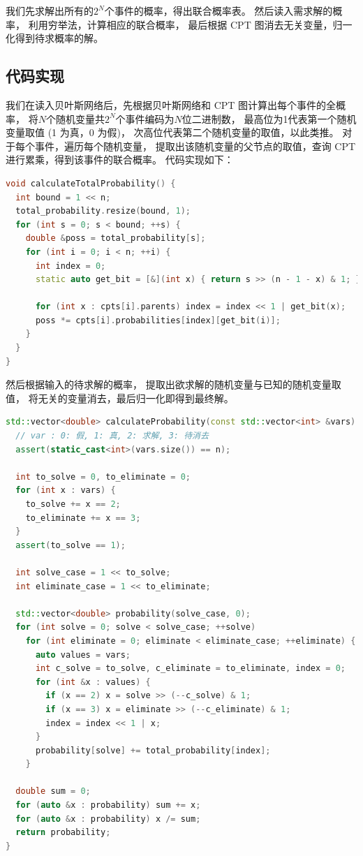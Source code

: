 \documentclass[12pt,onecolumn]{report}
\theoremstyle{plain}
\numberwithin{figure}{section}
\begin{document}
我们先求解出所有的$2^{N}$个事件的概率，得出联合概率表。
然后读入需求解的概率，
利用穷举法，计算相应的联合概率，
最后根据 CPT 图消去无关变量，归一化得到待求概率的解。

\subsection{代码实现}
我们在读入贝叶斯网络后，先根据贝叶斯网络和 CPT 图计算出每个事件的全概率，
将$N$个随机变量共$2^N$个事件编码为$N$位二进制数，
最高位为1代表第一个随机变量取值 (1 为真，0 为假)，
次高位代表第二个随机变量的取值，以此类推。
对于每个事件，遍历每个随机变量，
提取出该随机变量的父节点的取值，查询 CPT 进行累乘，得到该事件的联合概率。
代码实现如下：

\begin{lstlisting}[language=c++]
void calculateTotalProbability() {
  int bound = 1 << n;
  total_probability.resize(bound, 1);
  for (int s = 0; s < bound; ++s) {
    double &poss = total_probability[s];
    for (int i = 0; i < n; ++i) {
      int index = 0;
      static auto get_bit = [&](int x) { return s >> (n - 1 - x) & 1; };

      for (int x : cpts[i].parents) index = index << 1 | get_bit(x);
      poss *= cpts[i].probabilities[index][get_bit(i)];
    }
  }
}
\end{lstlisting}

然后根据输入的待求解的概率，
提取出欲求解的随机变量与已知的随机变量取值，
将无关的变量消去，最后归一化即得到最终解。

\begin{lstlisting}[language=c++]
std::vector<double> calculateProbability(const std::vector<int> &vars) const {
  // var : 0: 假, 1: 真, 2: 求解, 3: 待消去
  assert(static_cast<int>(vars.size()) == n);

  int to_solve = 0, to_eliminate = 0;
  for (int x : vars) {
    to_solve += x == 2;
    to_eliminate += x == 3;
  }
  assert(to_solve == 1);

  int solve_case = 1 << to_solve;
  int eliminate_case = 1 << to_eliminate;

  std::vector<double> probability(solve_case, 0);
  for (int solve = 0; solve < solve_case; ++solve)
    for (int eliminate = 0; eliminate < eliminate_case; ++eliminate) {
      auto values = vars;
      int c_solve = to_solve, c_eliminate = to_eliminate, index = 0;
      for (int &x : values) {
        if (x == 2) x = solve >> (--c_solve) & 1;
        if (x == 3) x = eliminate >> (--c_eliminate) & 1;
        index = index << 1 | x;
      }
      probability[solve] += total_probability[index];
    }

  double sum = 0;
  for (auto &x : probability) sum += x;
  for (auto &x : probability) x /= sum;
  return probability;
}
\end{lstlisting}
\end{document}
